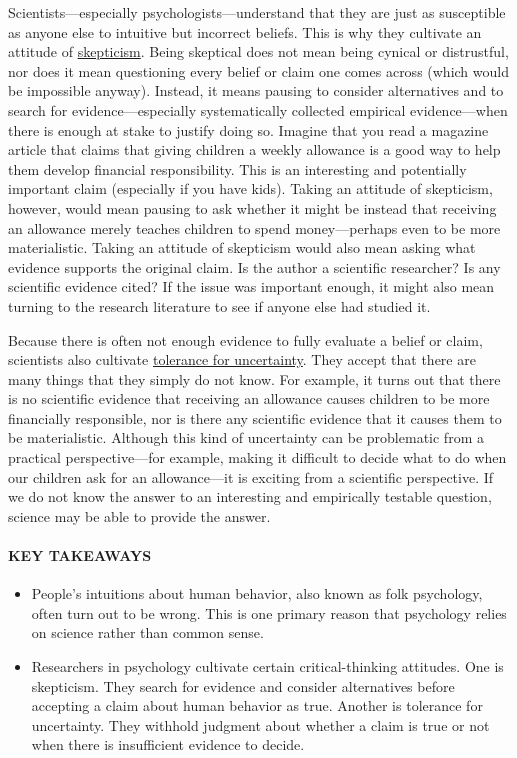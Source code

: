 \documentclass[
]{krantz}
\providecommand{\tightlist}{%
  \setlength{\itemsep}{0pt}\setlength{\parskip}{0pt}}
\begin{document}
Scientists---especially psychologists---understand that they are just as susceptible as anyone else to intuitive but incorrect beliefs. This is why they cultivate an attitude of \hyperref[skepticism]{skepticism}. Being skeptical does not mean being cynical or distrustful, nor does it mean questioning every belief or claim one comes across (which would be impossible anyway). Instead, it means pausing to consider alternatives and to search for evidence---especially systematically collected empirical evidence---when there is enough at stake to justify doing so. Imagine that you read a magazine article that claims that giving children a weekly allowance is a good way to help them develop financial responsibility. This is an interesting and potentially important claim (especially if you have kids). Taking an attitude of skepticism, however, would mean pausing to ask whether it might be instead that receiving an allowance merely teaches children to spend money---perhaps even to be more materialistic. Taking an attitude of skepticism would also mean asking what evidence supports the original claim. Is the author a scientific researcher? Is any scientific evidence cited? If the issue was important enough, it might also mean turning to the research literature to see if anyone else had studied it.

Because there is often not enough evidence to fully evaluate a belief or claim, scientists also cultivate \hyperref[tolerance-for-uncertainty]{tolerance for uncertainty}. They accept that there are many things that they simply do not know. For example, it turns out that there is no scientific evidence that receiving an allowance causes children to be more financially responsible, nor is there any scientific evidence that it causes them to be materialistic. Although this kind of uncertainty can be problematic from a practical perspective---for example, making it difficult to decide what to do when our children ask for an allowance---it is exciting from a scientific perspective. If we do not know the answer to an interesting and empirically testable question, science may be able to provide the answer.

\paragraph*{KEY TAKEAWAYS}\label{key-takeaways-2}

\begin{itemize}
\tightlist
\item
  People's intuitions about human behavior, also known as folk psychology, often turn out to be wrong. This is one primary reason that psychology relies on science rather than common sense.
\item
  Researchers in psychology cultivate certain critical-thinking attitudes. One is skepticism. They search for evidence and consider alternatives before accepting a claim about human behavior as true. Another is tolerance for uncertainty. They withhold judgment about whether a claim is true or not when there is insufficient evidence to decide.
\end{itemize}
\end{document}
